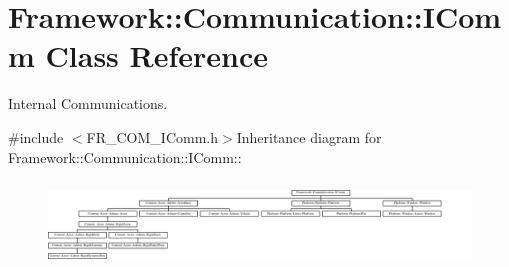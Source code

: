 \hypertarget{classFramework_1_1Communication_1_1IComm}{
\section{Framework::Communication::IComm Class Reference}
\label{classFramework_1_1Communication_1_1IComm}
}


Internal Communications.  


{\ttfamily \#include $<$FR\_\-COM\_\-IComm.h$>$}Inheritance diagram for Framework::Communication::IComm::\begin{figure}[H]
\begin{center}
\leavevmode
\includegraphics[height=2.28571cm]{classFramework_1_1Communication_1_1IComm}
\end{center}
\end{figure}
